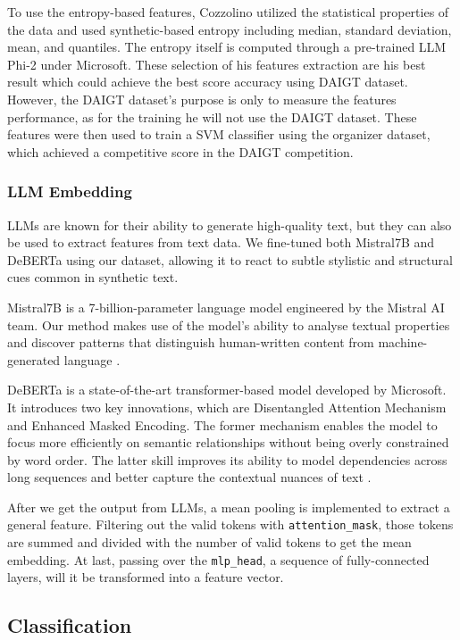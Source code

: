 \documentclass[conference]{IEEEtran}
\begin{document}
To use the entropy-based features, Cozzolino utilized the statistical properties of the data and used synthetic-based entropy including median, standard deviation, mean, and quantiles. The entropy itself is computed through a pre-trained LLM Phi-2 under Microsoft. These selection of his features extraction are his best result which could achieve the best score accuracy using DAIGT dataset. However, the DAIGT dataset's purpose is only to measure the features performance, as for the training he will not use the DAIGT dataset. These features were then used to train a SVM classifier using the organizer dataset, which achieved a competitive score in the DAIGT competition.

\subsubsection{LLM Embedding}
\label{sec:llm_embedding}

LLMs are known for their ability to generate high-quality text, but they can also be used to extract features from text data. We fine-tuned both Mistral7B and DeBERTa using our dataset, allowing it to react to subtle stylistic and structural cues common in synthetic text.

Mistral7B is a 7-billion-parameter language model engineered by the Mistral AI team. Our method makes use of the model's ability to analyse textual properties and discover patterns that distinguish human-written content from machine-generated language \cite{mistral7b}.

DeBERTa is a state-of-the-art transformer-based model developed by Microsoft. It introduces two key innovations, which are Disentangled Attention Mechanism and Enhanced Masked Encoding. The former mechanism enables the model to focus more efficiently on semantic relationships without being overly constrained by word order. The latter skill improves its ability to model dependencies across long sequences and better capture the contextual nuances of text \cite{deberta}.

After we get the output from LLMs, a mean pooling is implemented to extract a general feature. Filtering out the valid tokens with \texttt{attention\_mask}, those tokens are summed and divided with the number of valid tokens to get the mean embedding. At last, passing over the \texttt{mlp\_head}, a sequence of fully-connected layers, will it be transformed into a feature vector.

\subsection{Classification}
\end{document}
